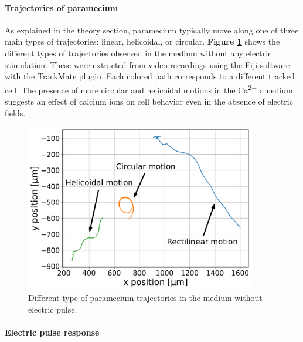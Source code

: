 \noindent
\begin{minipage}{0.39\textwidth}

    \paragraph{Trajectories of paramecium}
    
    As explained in the theory section, paramecium typically move along one of three main types of trajectories: linear, helicoidal, or circular. \textbf{Figure \ref{fig:trajectories}} shows the different types of trajectories observed in the  medium without any electric stimulation. These were extracted from video recordings using the Fiji software with the TrackMate plugin. Each colored path corresponds to a different tracked cell. The presence of more circular and helicoidal motions in the Ca\textsuperscript{2+} dmedium suggests an effect of calcium ions on cell behavior even in the absence of electric fields. 

\end{minipage}
\hfill
\begin{minipage}{0.59\textwidth}
    \begin{figure}[H]
    \centering 
    \captionsetup{width=0.95\linewidth, justification=centering}
    \includegraphics[width=0.9\textwidth]{Figures/2.5mM_0V_007_trajectories.pdf}
    \caption{Different type of paramecium trajectories in the  medium without electric pulse.}
    \label{fig:trajectories}
    \end{figure}
\end{minipage}

\paragraph{Electric pulse response}

